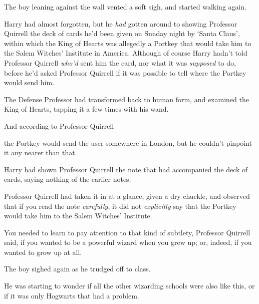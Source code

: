 The boy leaning against the wall vented a soft sigh, and started walking again.

Harry had almost forgotten, but he \emph{had} gotten around to showing
Professor Quirrell the deck of cards he'd been given on Sunday night by `Santa
Claus', within which the King of Hearts was allegedly a Portkey that would take
him to the Salem Witches' Institute in America. Although of course Harry hadn't
told Professor Quirrell \emph{who'd} sent him the card, nor what it was
\emph{supposed} to do, before he'd asked Professor Quirrell if it was possible
to tell where the Portkey would send him.

The Defense Professor had transformed back to human form, and examined the King
of Hearts, tapping it a few times with his wand.

And according to Professor Quirrell{\el}

{\el} the Portkey would send the user somewhere in London, but he couldn't
pinpoint it any nearer than that.

Harry had shown Professor Quirrell the note that had accompanied the deck of
cards, saying nothing of the earlier notes.

Professor Quirrell had taken it in at a glance, given a dry chuckle, and
observed that if you read the note \emph{carefully}, it did not
\emph{explicitly} say that the Portkey would take him to the Salem Witches'
Institute.

You needed to learn to pay attention to that kind of subtlety, Professor
Quirrell said, if you wanted to be a powerful wizard when you grew up; or,
indeed, if you wanted to grow up at all.

The boy sighed again as he trudged off to class.

He was starting to wonder if all the other wizarding schools were also like
this, or if it was only Hogwarts that had a problem.
